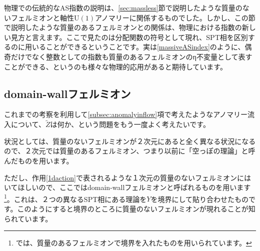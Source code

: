 \documentclass[paper=a4, fontsize=12pt, line_length=16cm, number_of_lines=33,dvipdfmx]{jlreq}
\numberwithin{equation}{section}
\newcommand{\U}{\mathrm{U}}
\newcommand{\Zt}{\widetilde{Z}}
\begin{document}
物理での伝統的なAS指数の説明は、\ref{sec:massless}節で説明したような質量のないフェルミオンと軸性$\U(1)$アノマリーに関係するものでした。しかし、この節で説明したような質量のあるフェルミオンとの関係は、物理における指数の新しい見方と言えます。ここで見たのは分配関数の符号として現れ、SPT相を区別するのに用いることができるということです。実は\eqref{massiveASindex}のように、偶奇だけでなく整数としての指数も質量のあるフェルミオンのη不変量として表すことができる、というのも様々な物理的応用があると期待しています。

\subsection{domain-wallフェルミオン}

これまでの考察を利用して\ref{subsec:anomalyinflow}項で考えたようなアノマリー流入について、$\Zt$は何か、という問題をもう一度よく考えたいです。

状況としては、質量のないフェルミオンが２次元にあると全く異なる状況になるので、２次元では質量のあるフェルミオン、つまり以前に「空っぽの理論」と呼んだものを用います。

ただし、作用\eqref{1daction}で表されるような１次元の質量のないフェルミオンにはいてほしいので、ここではdomain-wallフェルミオンと呼ばれるものを用います\footnote{\cite{Yonekura:2016wuc,Witten:2019bou}では、質量のあるフェルミオンで境界を入れたものを用いられています。}。これは、２つの異なるSPT相にある理論を$Y$を境界にして貼り合わせたものです。このようにすると境界のところに質量のないフェルミオンが現れることが知られています。
\end{document}
